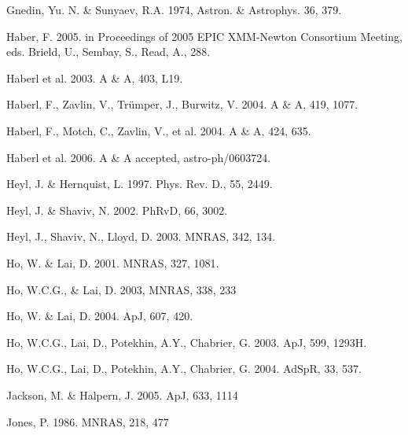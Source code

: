 \documentclass[useAMS,onecolumn,usenatbib,usegraphicx]{mn2e}
\begin{document}
\begin{thebibliography}{}
Gnedin, Yu. N. \& Sunyaev, R.A. 1974, Astron. \& Astrophys. 36, 379.

Haber, F. 2005. in Proceedings of 2005 EPIC XMM-Newton Consortium Meeting, eds.
Brield, U., Sembay, S., Read, A., 288.

Haberl et al. 2003.  A \& A, 403, L19.

Haberl, F., Zavlin, V., Tr\"umper, J., Burwitz, V. 2004.  A \& A, 419, 1077.

Haberl, F., Motch, C., Zavlin, V., et al. 2004. A \& A, 424, 635.

Haberl et al. 2006. A \& A accepted, astro-ph/0603724.

Heyl, J. \& Hernquist, L. 1997. Phys. Rev. D., 55, 2449.

Heyl, J. \& Shaviv, N. 2002. PhRvD, 66, 3002.

Heyl, J., Shaviv, N., Lloyd, D. 2003. MNRAS, 342, 134.

Ho, W. \& Lai, D. 2001. MNRAS, 327, 1081.

Ho, W.C.G., \& Lai, D. 2003, MNRAS, 338, 233 

Ho, W. \& Lai, D. 2004. ApJ, 607, 420.

Ho, W.C.G., Lai, D., Potekhin, A.Y., Chabrier, G. 2003. ApJ, 599, 1293H.

Ho, W.C.G., Lai, D., Potekhin, A.Y., Chabrier, G. 2004. AdSpR, 33, 537.

Jackson, M. \& Halpern, J. 2005. ApJ, 633, 1114

Jones, P. 1986. MNRAS, 218, 477


\end{thebibliography}
\end{document}
